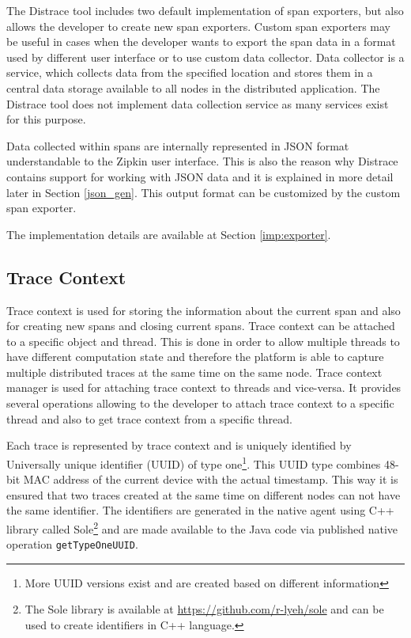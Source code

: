 The Distrace tool includes two default implementation of span exporters, but also allows the developer to create new span exporters. Custom span exporters may be useful in cases when the developer wants to export the span data in a format used by different user interface or to use custom data collector. Data collector is a service, which collects data from the specified location and stores them in a central data storage available to all nodes in the distributed application. The Distrace tool does not implement data collection service as many services exist for this purpose. 

Data collected within spans are internally represented in JSON format understandable to the Zipkin user interface. This is also the reason why Distrace contains support for working with JSON data and it is explained in more detail later in Section \ref{json_gen}. This output format can be customized by the custom span exporter.

The implementation details are available at Section \ref{imp:exporter}.
\subsection{Trace Context}
Trace context is used for storing the information about the current span and also for creating new spans and closing current spans. Trace context can be attached to a specific object and thread. This is done in order to allow multiple threads to have different computation state and therefore the platform is able to capture multiple distributed traces at the same time on the same node. Trace context manager is used for attaching trace context to threads and vice-versa. It provides several operations allowing to the developer to attach trace context to a specific thread and also to get trace context from a specific thread.

Each trace is represented by trace context and is uniquely identified by Universally unique identifier (UUID) of type one\footnote{More UUID versions exist and are created based on different information}. This UUID type combines 48-bit MAC address of the current device with the actual timestamp. This way it is ensured that two traces created at the same time on different nodes can not have the same identifier. The identifiers are generated in the native agent using C++ library called Sole\footnote{The Sole library is available at \url{https://github.com/r-lyeh/sole} and can be used to create identifiers in C++ language.} and are made available to the Java code via published native operation \texttt{getTypeOneUUID}.

